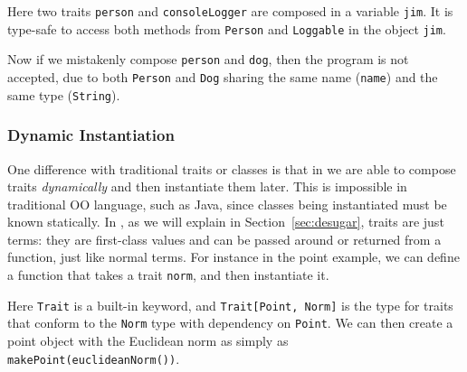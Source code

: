 
Here two traits \lstinline{person} and \lstinline{consoleLogger} are composed in
a variable \lstinline{jim}. It is type-safe to access both methods from
\lstinline{Person} and \lstinline{Loggable} in the object \lstinline{jim}.

Now if we mistakenly compose \lstinline$person$ and \lstinline$dog$, then the
program is not accepted, due to both \lstinline{Person} and \lstinline{Dog}
sharing the same name (\lstinline{name}) and the same type (\lstinline$String$).

\subsubsection{Dynamic Instantiation}

One difference with traditional traits or classes is that in \name we are able
to compose traits \textit{dynamically} and then instantiate them later. This is
impossible in traditional OO language, such as Java, since classes being
instantiated must be known statically. In \name, as we will explain in
Section~\ref{sec:desugar}, traits are just terms: they are first-class values
and can be passed around or returned from a function, just like normal terms.
For instance in the point example, we can define a function that takes a trait
\lstinline$norm$, and then instantiate it.

Here \lstinline{Trait} is a built-in keyword, and \lstinline$Trait[Point, Norm]$
is the type for traits that conform to the \lstinline$Norm$ type with dependency
on \lstinline$Point$. We can then create a point object with the Euclidean norm
as simply as \lstinline$makePoint(euclideanNorm())$.
